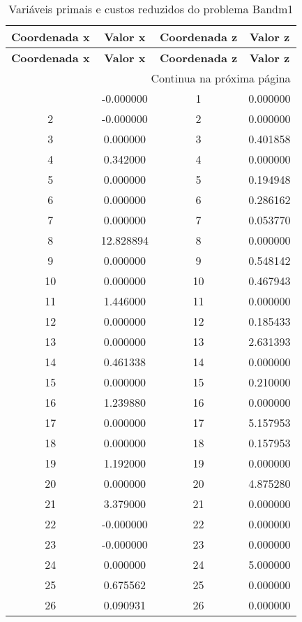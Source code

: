 \documentclass[12pt]{article}
\begin{document}
\begin{longtable}{@{}cccc@{}}
\caption{Variáveis primais e custos reduzidos do problema Bandm1} \\
\toprule
\textbf{Coordenada x} & \textbf{Valor x} & \textbf{Coordenada z} & \textbf{Valor z} \\
\midrule
\endfirsthead

\toprule
\textbf{Coordenada x} & \textbf{Valor x} & \textbf{Coordenada z} & \textbf{Valor z} \\
\midrule
\endhead

\midrule \multicolumn{4}{r}{{Continua na próxima página}} \\ \midrule
\endfoot

\bottomrule
\endlastfoot
1 & -0.000000 & 1 & 0.000000 \\
2 & -0.000000 & 2 & 0.000000 \\
3 & 0.000000 & 3 & 0.401858 \\
4 & 0.342000 & 4 & 0.000000 \\
5 & 0.000000 & 5 & 0.194948 \\
6 & 0.000000 & 6 & 0.286162 \\
7 & 0.000000 & 7 & 0.053770 \\
8 & 12.828894 & 8 & 0.000000 \\
9 & 0.000000 & 9 & 0.548142 \\
10 & 0.000000 & 10 & 0.467943 \\
11 & 1.446000 & 11 & 0.000000 \\
12 & 0.000000 & 12 & 0.185433 \\
13 & 0.000000 & 13 & 2.631393 \\
14 & 0.461338 & 14 & 0.000000 \\
15 & 0.000000 & 15 & 0.210000 \\
16 & 1.239880 & 16 & 0.000000 \\
17 & 0.000000 & 17 & 5.157953 \\
18 & 0.000000 & 18 & 0.157953 \\
19 & 1.192000 & 19 & 0.000000 \\
20 & 0.000000 & 20 & 4.875280 \\
21 & 3.379000 & 21 & 0.000000 \\
22 & -0.000000 & 22 & 0.000000 \\
23 & -0.000000 & 23 & 0.000000 \\
24 & 0.000000 & 24 & 5.000000 \\
25 & 0.675562 & 25 & 0.000000 \\
26 & 0.090931 & 26 & 0.000000 \\

\end{longtable}
\end{document}
